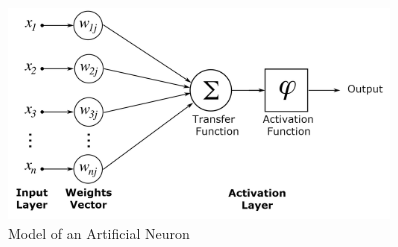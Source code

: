 \documentclass[12pt,oneside]{CUNY_CS_PhD}
\begin{document}
\begin{figure}[h]
\centering
\includegraphics[width=0.9\textwidth]{pictures/ArtificialNeuronModel.png}
\caption{Model of an Artificial Neuron}
\label{fig:neuron}
\end{figure}
\end{document}
